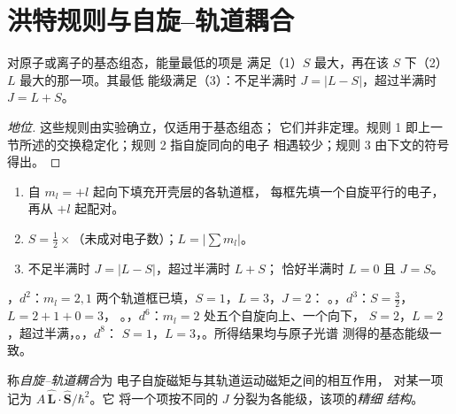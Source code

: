 \section{洪特规则与自旋–轨道耦合}

\begin{proposition}[项的洪特规则]\label{prop:b3:many-electron-atoms:hund-terms}
对原子或离子的基态组态，能量最低的项是
满足（1）$S$ 最大，再在该 $S$ 下（2）$L$ 最大的那一项。其最低
能级满足（3）：不足半满时 $J = |L - S|$，超过半满时 $J = L +
S$。
\end{proposition}
\begin{proof}[地位]
这些规则由实验确立，仅适用于基态组态；
它们并非定理。规则 1 即上一
节所述的交换稳定化；规则 2 指自旋同向的电子
相遇较少；规则 3 由下文的符号得出。
\end{proof}

\begin{method}[由轨道框图求基态项]\label{met:b3:many-electron-atoms:ground-term}
\begin{enumerate}
  \item 自 $m_l = +l$ 起向下填充开壳层的各轨道框，
        每框先填一个自旋平行的电子，再从 $+l$ 起配对。
  \item $S = \frac12 \times$（未成对电子数）；$L = |\sum m_l|$。
  \item 不足半满时 $J = |L - S|$，超过半满时 $L + S$；
        恰好半满时 $L = 0$ 且 $J = S$。
\end{enumerate}
\end{method}

\begin{example}[基态项]\label{ex:b3:many-electron-atoms:ground-terms}
，$d^2$：$m_l = 2, 1$ 两个轨道框已填，$S = 1$，$L = 3$，$J = 2$：
。，$d^3$：$S = \frac32$，$L = 2 + 1 + 0 = 3$，
。，$d^6$：$m_l = 2$ 处五个自旋向上、一个向下，
$S = 2$，$L = 2$，超过半满，。，$d^8$：
$S = 1$，$L = 3$，。所得结果均与原子光谱
测得的基态能级一致。
\end{example}

\begin{definition}\label{def:b3:many-electron-atoms:spin-orbit}
称\emph{自旋–轨道耦合}为
电子自旋磁矩与其轨道运动磁矩之间的相互作用，
对某一项记为 $A\,\hat{\mathbf L}\cdot\hat{\mathbf S}/\hbar^2$。它
将一个项按不同的 $J$ 分裂为各能级，该项的\emph{精细
结构}。
\end{definition}

